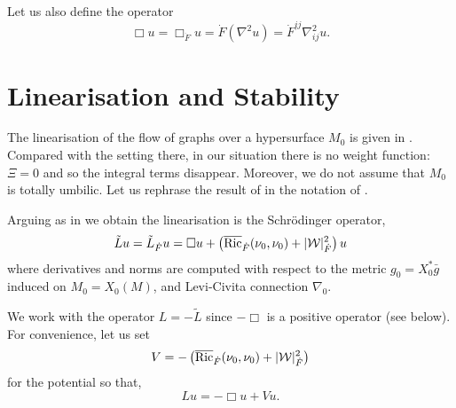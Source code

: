 \documentclass{amsart}
\begin{document}
Let us also define the operator
\[
\Box u = \Box_{\dot{F}} u = \dot{F}(\nabla^2 u) = \dot{F}^{ij} \nabla^2_{ij} u.
\]

\section{Linearisation and Stability}
\label{sec:linearising_linearisation}

The linearisation of the flow of graphs over a hypersurface $M_0$ is given in \cite[Lemma 3.5]{Harltey:/2016}. Compared with the setting there, in our situation there is no weight function: \(\Xi = 0\) and so the integral terms disappear. Moreover, we do not assume that \(M_0\) is totally umbilic. Let us rephrase the result of \cite[Lemma 3.5]{Harltey:/2016} in the notation of .

Arguing as in \cite[Lemmas 3.1, 3,2, 3.5]{Harltey:/2016} we obtain the linearisation is the Schr\"odinger operator,
\begin{equation}
\label{eq:linearisation}
\tilde{L} u = \tilde{L}_{\dot{F}} u = \Box u + \left(\overline{\operatorname{Ric}}_{\dot{F}}(\nu_0, \nu_0) + |\mathcal{W}|_{\dot{F}}^2\right) u
\end{equation}
where derivatives and norms are computed with respect to the metric \(g_0 = X_0^{\ast} \bar{g}\) induced on \(M_0 = X_0(M)\), and Levi-Civita connection \(\nabla_0\).

We work with the operator \(L = -\tilde{L}\) since \(-\Box\) is a positive operator (see  below). For convenience, let us set
\[
V = -\left(\overline{\operatorname{Ric}}_{\dot{F}}(\nu_0, \nu_0) + |\mathcal{W}|_{\dot{F}}^2\right)
\]
for the potential so that,
\[
L u = -\Box u + V u.
\]
\end{document}
